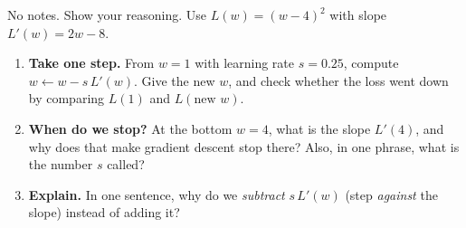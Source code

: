 \documentclass[10pt]{article}
\begin{document}
\namedateperiod

\vspace{0.15in}

No notes. Show your reasoning. Use $L(w)=(w-4)^2$ with slope $L'(w)=2w-8$.

\begin{enumerate}[leftmargin=1.8em, itemsep=16pt]
  \item \textbf{Take one step.} From $w=1$ with learning rate $s=0.25$, compute $w\leftarrow w-s\,L'(w)$.
        Give the new $w$, and check whether the loss went down by comparing $L(1)$ and $L(\text{new }w)$.
        \vspace{1.7cm}
  \item \textbf{When do we stop?} At the bottom $w=4$, what is the slope $L'(4)$, and why does that make
        gradient descent stop there? Also, in one phrase, what is the number $s$ called?
        \vspace{1.2cm}
  \item \textbf{Explain.} In one sentence, why do we \emph{subtract} $s\,L'(w)$ (step \emph{against} the
        slope) instead of adding it?
\end{enumerate}
\end{document}
